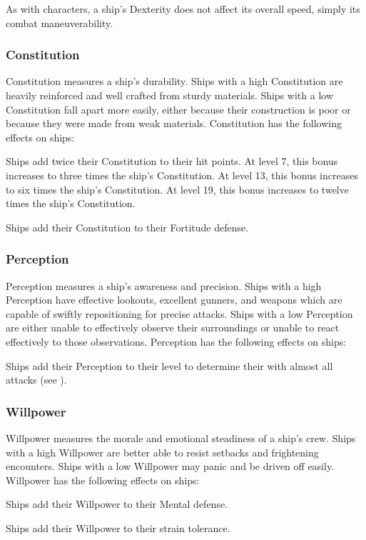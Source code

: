         As with characters, a ship's Dexterity does not affect its overall speed, simply its combat maneuverability.

    \subsubsection{Constitution}
        Constitution measures a ship's durability.
        Ships with a high Constitution are heavily reinforced and well crafted from sturdy materials.
        Ships with a low Constitution fall apart more easily, either because their construction is poor or because they were made from weak materials.
        Constitution has the following effects on ships:
        \begin{raggeditemize}
            \item Ships add twice their Constitution to their hit points.
                At level 7, this bonus increases to three times the ship's Constitution.
                At level 13, this bonus increases to six times the ship's Constitution.
                At level 19, this bonus increases to twelve times the ship's Constitution.
            \item Ships add their Constitution to their Fortitude defense.
        \end{raggeditemize}

    \subsubsection{Perception}
        Perception measures a ship's awareness and precision.
        Ships with a high Perception have effective lookouts, excellent gunners, and weapons which are capable of swiftly repositioning for precise attacks.
        Ships with a low Perception are either unable to effectively observe their surroundings or unable to react effectively to those observations.
        Perception has the following effects on ships:
        \begin{raggeditemize}
            \item Ships add their Perception to their level to determine their  with almost all attacks (see ).
        \end{raggeditemize}

    \subsubsection{Willpower}
        Willpower measures the morale and emotional steadiness of a ship's crew.
        Ships with a high Willpower are better able to resist setbacks and frightening encounters.
        Ships with a low Willpower may panic and be driven off easily.
        Willpower has the following effects on ships:
        \begin{raggeditemize}
            \item Ships add their Willpower to their Mental defense.
            \item Ships add their Willpower to their strain tolerance.
        \end{raggeditemize}

